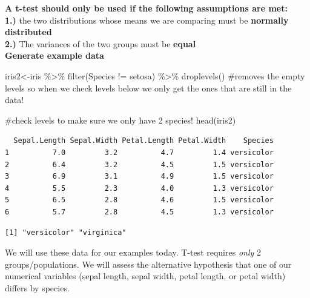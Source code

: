 \documentclass[
  letterpaper,
  DIV=11,
  numbers=noendperiod]{scrartcl}
\newenvironment{Shaded}{\begin{snugshade}}{\end{snugshade}}
\newcommand{\CommentTok}[1]{\textcolor[rgb]{0.37,0.37,0.37}{#1}}
\newcommand{\FunctionTok}[1]{\textcolor[rgb]{0.28,0.35,0.67}{#1}}
\newcommand{\NormalTok}[1]{\textcolor[rgb]{0.00,0.23,0.31}{#1}}
\newcommand{\OtherTok}[1]{\textcolor[rgb]{0.00,0.23,0.31}{#1}}
\newcommand{\SpecialCharTok}[1]{\textcolor[rgb]{0.37,0.37,0.37}{#1}}
\newcommand{\StringTok}[1]{\textcolor[rgb]{0.13,0.47,0.30}{#1}}
\begin{document}
\textbf{A t-test should only be used if the following assumptions are
met:}\\
\textbf{1.)} the two distributions whose means we are comparing must be
\textbf{normally distributed}\\
\textbf{2.)} The variances of the two groups must be \textbf{equal}\\

\textbf{Generate example data}

\begin{Shaded}
\begin{Highlighting}[]
\NormalTok{iris2}\OtherTok{\textless{}{-}}\NormalTok{iris }\SpecialCharTok{\%\textgreater{}\%}
  \FunctionTok{filter}\NormalTok{(Species }\SpecialCharTok{!=} \StringTok{\textquotesingle{}setosa\textquotesingle{}}\NormalTok{) }\SpecialCharTok{\%\textgreater{}\%}
  \FunctionTok{droplevels}\NormalTok{() }\CommentTok{\#removes the empty levels so when we check levels below we only get the ones that are still in the data!}

\CommentTok{\#check levels to make sure we only have 2 species!}
\FunctionTok{head}\NormalTok{(iris2)}
\end{Highlighting}
\end{Shaded}

\begin{verbatim}
  Sepal.Length Sepal.Width Petal.Length Petal.Width    Species
1          7.0         3.2          4.7         1.4 versicolor
2          6.4         3.2          4.5         1.5 versicolor
3          6.9         3.1          4.9         1.5 versicolor
4          5.5         2.3          4.0         1.3 versicolor
5          6.5         2.8          4.6         1.5 versicolor
6          5.7         2.8          4.5         1.3 versicolor
\end{verbatim}

\begin{Shaded}
\end{Shaded}

\begin{verbatim}
[1] "versicolor" "virginica" 
\end{verbatim}

We will use these data for our examples today. T-test requires
\emph{only} 2 groups/populations. We will assess the alternative
hypothesis that one of our numerical variables (sepal length, sepal
width, petal length, or petal width) differs by species.
\end{document}
